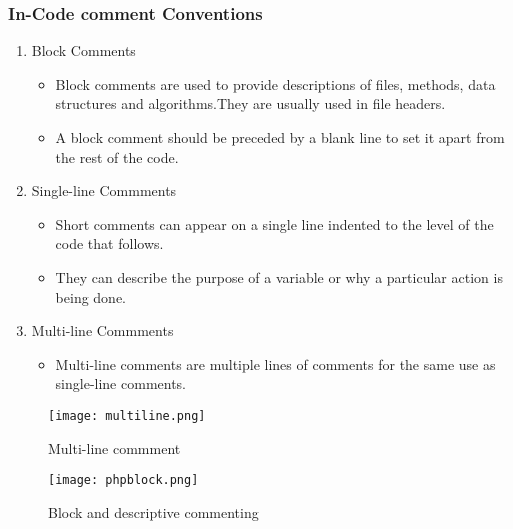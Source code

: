 \documentclass[12pt,a4paper]{article}
\begin{document}
	\subsubsection{In-Code comment Conventions}
	\begin{enumerate}
		\item Block Comments
		\begin{itemize}
		\item Block comments are used to provide descriptions of files, methods, data structures and
algorithms.They are usually used in file headers.
		\item A block comment should be preceded by a blank line to set it apart from the rest of the code.
	\end{itemize}	
	\item Single-line Commments
	\begin{itemize}
		\item Short comments can appear on a single line indented to the level of the code that follows.
		\item They can describe the purpose of a variable or why a particular action is being done.
	\end{itemize}
	\item Multi-line Commments
	\begin{itemize}
		\item Multi-line comments are multiple lines of comments for the same use as single-line comments.
	\end{itemize}				 
	\end{enumerate}
	
	\begin{figure}[ht]
		 	\begin{minipage}[b]{0.45 \linewidth}
		 	\centering
		 	\texttt{[image: multiline.png]}
		 	\caption{Multi-line commment}
		 	\label{Commenting}
		 	\end{minipage}
			\begin{minipage}[b]{0.45 \linewidth}
		 	\centering
		 	\texttt{[image: phpblock.png]}
		 	\caption{Block and descriptive commenting}
		 	\label{Block and descriptive commenting}
		 	\end{minipage}
		 \end{figure}
	
\end{document}
